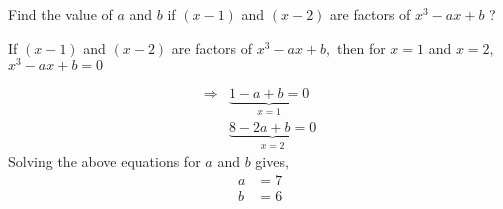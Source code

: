        \question[4] Find the value of $a$ and $b$ if $(x-1)$ and $(x-2)$
       are factors of $x^3-ax+b$ ?

       \ifprintanswers
       \fi 
       \begin{solution}[\halfpage]
          If $(x-1)$ and $(x-2)$ are factors of $x^3-ax+b$,\, 
          then for $x=1$ and $x=2$,\,$x^3-ax+b = 0$

          \begin{align}
            \Rightarrow & \underbrace{1-a+b = 0}_{\texttt{$x=1$}} \\ 
                        & \underbrace{8-2a+b = 0}_{\texttt{$x=2$}}
          \end{align} 
          Solving the above equations for $a$ and $b$ gives, 
          \begin{align}
            a &= 7 \\
            b &= 6
          \end{align} 
       \end{solution} 
